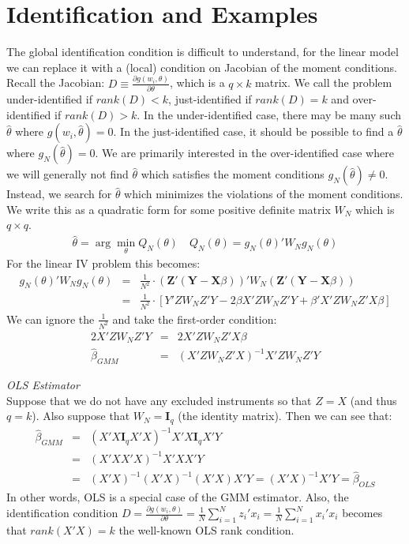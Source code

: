 \documentclass[a4paper]{article}
\begin{document}
\section*{\normalsize  Identification and Examples}
The global identification condition is difficult to understand, for the linear model we can replace it with a (local) condition on Jacobian of the moment conditions. Recall the Jacobian: $D \equiv \frac{\partial g(w_i,\theta)}{\partial \theta}$, which is a $q \times k$ matrix. We call the problem under-identified if $rank(D) < k$, just-identified if $rank(D) = k$ and over-identified if $rank(D) > k$. In the under-identified case, there may be many such $\hat{\theta}$ where $g(w_i,\hat{\theta}) =0$. In the just-identified case, it should be possible to find a $\hat{\theta}$ where $g_N(\hat{\theta})=0$. We are primarily interested in the over-identified case where we will generally not find $\hat{\theta}$ which satisfies the moment conditions $g_N(\hat{\theta})\neq0$. Instead, we search for $\hat{\theta}$ which minimizes the violations of the moment conditions. We write this as a quadratic form for some positive definite matrix $W_N$ which is $q \times q$.
\begin{eqnarray*}
\hat{\theta} = \arg \min_{\theta}  Q_N(\theta) \quad Q_N(\theta)=g_N(\theta)' W_N  g_N(\theta)
\end{eqnarray*}
For the linear IV problem this becomes:
\begin{eqnarray*}
g_N(\theta)' W_N  g_N(\theta) &=& \frac{1}{N^2} \cdot (\mathbf{Z}' (\mathbf{Y} - \mathbf{X} \beta))' W_N (\mathbf{Z}' (\mathbf{Y} - \mathbf{X} \beta)) \\
&=& \frac{1}{N^2}\cdot [Y'Z W_N Z' Y - 2 \beta X' Z W_N Z' Y + \beta' X' Z W_N Z' X \beta]
\end{eqnarray*}
We can ignore the $\frac{1}{N^2}$ and take the first-order condition:
\begin{eqnarray*}
2 X'Z W_N Z' Y &=& 2 X'Z W_N Z' X \beta\\
\hat{\beta}_{GMM} &=& (X'Z W_N Z' X)^{-1} X' Z W_N Z'Y
\end{eqnarray*}

\noindent \textit{OLS Estimator}\\
Suppose that we do not have any excluded instruments so that $Z=X$ (and thus $q=k$). Also suppose that $W_N = \mathbf{I}_q$ (the identity matrix). Then we can see that:
\begin{eqnarray*}
\hat{\beta}_{GMM} &=& (X'X \mathbf{I}_q X' X)^{-1} X' X \mathbf{I}_q X'Y\\
 &=& (X'X X' X)^{-1} X' X X'Y\\
 &=& (X'X)^{-1} (X' X)^{-1} (X' X) X'Y =  (X'X)^{-1} X'Y = \hat{\beta}_{OLS}
\end{eqnarray*}
In other words, OLS is a special case of the GMM estimator. Also, the identification condition $D=\frac{\partial g(w_i,\theta)}{\partial \theta} =\frac{1}{N} \sum_{i=1}^N z_i' x_i = \frac{1}{N} \sum_{i=1}^N x_i' x_i$ becomes that $rank(X'X) = k$ the well-known OLS rank condition.\\
\end{document}
